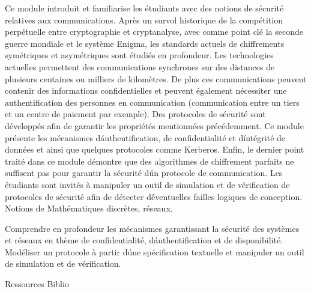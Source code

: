 {
Ce module introduit et familiarise les étudiants avec des notions de sécurité relatives aux communications.
Après un survol historique de la compétition perpétuelle entre cryptographie et cryptanalyse, avec comme point clé
la seconde guerre mondiale et le système Enigma, les standards actuels de chiffrements symétriques et asymétriques
sont étudiés en profondeur. Les technologies actuelles permettent des communications synchrones sur des distances
de plusieurs centaines ou milliers de kilomètres. De plus ces communications peuvent contenir des informations
confidentielles et peuvent également nécessiter une authentification des personnes en communication
(communication entre un tiers et un centre de paiement par exemple). Des protocoles de sécurité sont développés
afin de garantir les propriétés mentionnées précédemment. 
Ce module présente les mécanismes d\'authentification,
de confidentialité et d\'intégrité de données et ainsi que quelques protocoles comme Kerberos.
Enfin, le dernier point traité dans ce module démontre que des algorithmes de chiffrement parfaits ne suffisent pas pour garantir
la sécurité d\'un protocole de communication. Les étudiants sont invités à manipuler un outil de simulation et de
vérification de protocoles de sécurité afin de détecter d\'éventuelles failles logiques de conception. 
} 
{Notions de Mathématiques discrètes, réseaux.} 
{\begin{itemize}
\ObjItem Comprendre en profondeur les mécanismes garantissant la sécurité des systèmes et réseaux en thème de
confidentialité, d\'authentification et de disponibilité. 
\ObjItem Modéliser un protocole à partir d\'une spécification textuelle et manipuler un outil de simulation et de vérification.
\end{itemize} 
} 
{Ressources} 
{Biblio} 
 
